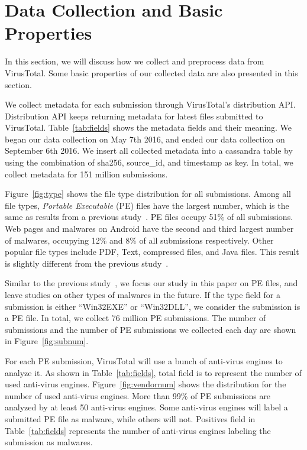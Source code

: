
\section{Data Collection and Basic Properties}
\label{sec:meth}

In this section, we will discuss how we collect and preprocess data from VirusTotal. 
Some basic properties of our collected data are also presented in this section. 




We collect metadata for each submission through VirusTotal’s distribution API. 
Distribution API keeps returning metadata for latest files submitted to VirusTotal.
Table~\ref{tab:fields} shows the metadata fields and their meaning.  
We began our data collection on May 7th 2016, 
and ended our data collection on September 6th 2016. 
We insert all collected metadata into a cassandra table by using the combination of sha256, source\_id, and timestamp as key.
In total, we collect metadata for 151 million submissions. 



Figure~\ref{fig:type} shows the file type distribution for all submissions. 
Among all file types, \textit{Portable Executable} (PE) files have the largest number, 
which is the same as results from a previous study~\cite{SongAPsys2016}.
PE files occupy 51\% of all submissions. 
Web pages and malwares on Android have the second and third largest number of malwares, 
occupying 12\% and 8\% of all submissions respectively. 
Other popular file types include PDF, Text, compressed files, and Java files. 
This result is slightly different from the previous study~\cite{SongAPsys2016}. 

Similar to the previous study~\cite{SongAPsys2016}, 
we focus our study in this paper on PE files, 
and leave studies on other types of malwares in the future. 
If the type field for a submission is either ``Win32EXE'' or ``Win32DLL'', 
we consider the submission is a PE file. 
In total, we collect 76 million PE submissions. 
The number of submissions and the number of PE submissions 
we collected each day are shown in Figure~\ref{fig:subnum}. 





For each PE submission, VirusTotal will use a bunch of anti-virus engines to analyze it.
As shown in Table~\ref{tab:fields}, 
total field is to represent the number of used anti-virus engines. 
Figure~\ref{fig:vendornum} shows the distribution for the number of used anti-virus engines. 
More than 99\% of PE submissions are analyzed by at least 50 anti-virus engines. 
Some anti-virus engines will label a submitted PE file as malware, while others will not. 
Positives field in Table~\ref{tab:fields} represents the number of anti-virus engines labeling the submission as malwares. 

